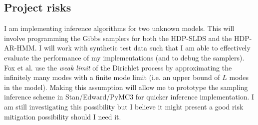 \documentclass[twoside]{article}
\begin{document}
\subsection{Project risks}\label{sec:risks}
I am implementing inference algorithms for two unknown models. This will involve programming the Gibbs samplers for both the HDP-SLDS and the HDP-AR-HMM. I will work with synthetic test data such that I am able to effectively evaluate the performance of my implementations (and to debug the samplers). Fox et al. use the \textit{weak limit} of the Dirichlet process by approximating the infinitely many modes with a finite mode limit (i.e. an upper bound of $L$ modes in the model). Making this assumption will allow me to prototype the sampling inference scheme in Stan/Edward/PyMC3 for quicker inference implementation. I am still investigating this possibility but I believe it might present a good risk mitigation possibility should I need it.



\end{document}
